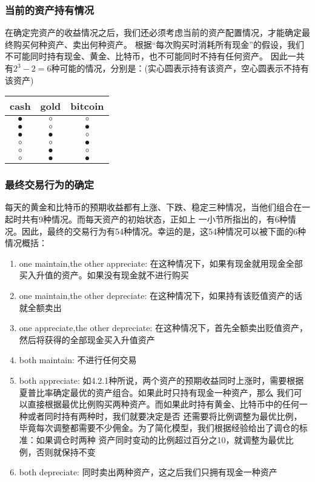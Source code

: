 \documentclass{mcmthesis}
\begin{document}
\subsubsection{当前的资产持有情况}
在确定完资产的收益情况之后，我们还必须考虑当前的资产配置情况，才能确定最终购买何种资产、卖出何种资产。
根据“每次购买时消耗所有现金”的假设，我们不可能同时持有现金、黄金、比特币，也不可能同时不持有任何资产。
因此一共有$2^3-2=6$种可能的情况，分别是：(实心圆表示持有该资产，空心圆表示不持有该资产)
\begin{tabular}{c c c}
  \hline
  cash&gold&bitcoin\\
  \hline
  \hline
  $\bullet$ & $\circ$  &  $\circ$\\
  \hline
  $\bullet$ & $\circ$  &  $\bullet $\\
  \hline
  $\bullet$ & $\bullet $  &  $\circ  $\\
  \hline
  $\circ $ & $\circ$  &  $\bullet $\\
  \hline
  $\circ $ & $\bullet $  &  $\circ  $\\
  \hline
  $\circ $ & $\bullet $  &  $\bullet   $\\
  \hline
  \end{tabular}

\subsubsection{最终交易行为的确定}
每天的黄金和比特币的预期收益都有上涨、下跌、稳定三种情况，当他们组合在一起时共有9种情况。而每天资产的初始状态，正如上
一小节所指出的，有6种情况。因此，最终的交易行为有54种情况。幸运的是，这54种情况可以被下面的6种情况概括：
\begin{enumerate}
  \item one maintain,the other appreciate:
  在这种情况下，如果有现金就用现金全部买入升值的资产。如果没有现金就不进行购买
  \item one maintain,the other depreciate:
  在这种情况下，如果持有该贬值资产的话就全额卖出
  \item one appreciate,the other depreciate:
  在这种情况下，首先全额卖出贬值资产，然后将获得的全部现金买入升值资产
  \item both maintain:
  不进行任何交易
  \item both appreciate:
  如4.2.1种所说，两个资产的预期收益同时上涨时，需要根据夏普比率确定最优的资产组合。如果此时只持有现金一种资产，那么
  我们可以直接根据最优比例购买两种资产。而如果此时持有黄金、比特币中的任何一种或者同时持有两种时，我们就要决定是否
  还需要将比例调整为最优比例，毕竟每次调整都需要不少佣金。为了简化模型，我们根据经验给出了调仓的标准：如果调仓时两种
  资产同时变动的比例超过百分之10，就调整为最优比例，否则就保持不变
  \item both depreciate:
  同时卖出两种资产，这之后我们只拥有现金一种资产
\end{enumerate}
\end{document}
